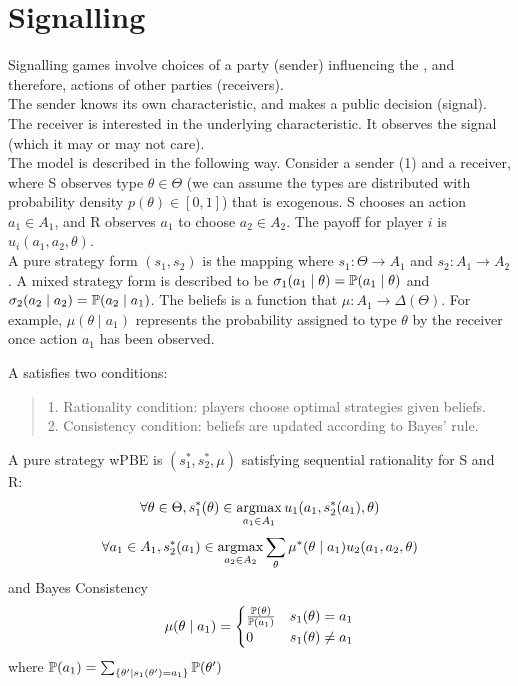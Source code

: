 \section{Signalling}
Signalling games involve choices of a party (sender) influencing the , and therefore, actions of other parties (receivers). \\
The sender knows its own characteristic, and makes a public decision (signal). \\
The receiver is interested in the underlying characteristic. It observes the signal (which it may or may not care). \\
The model is described in the following way. Consider a sender (1) and a receiver, where S observes type $\theta \in \Theta$ (we can assume the types are distributed with probability density $p(\theta) \in [0, 1]$) that is exogenous. S chooses an action $a_1 \in A_1$, and R observes $a_1$ to choose $a_2 \in A_2$. The payoff for player $i$ is $u_i(a_1, a_2, \theta)$. \\
A pure strategy form $(s_1, s_2)$ is the mapping where $s_1: \Theta \to A_1$ and $s_2: A_1 \to A_2$. A mixed strategy form is described to be $\sigma_1(a_1 \mid \theta) = \mathbb{P}(a_1 \mid \theta)$ and $\sigma_2(a_2 \mid a_2) = \mathbb{P}(a_2 \mid a_1)$. The beliefs is a function that $\mu: A_1 \to \Delta(\Theta)$. For example, $\mu(\theta \mid a_1)$ represents the probability assigned to type $\theta$ by the receiver once action $a_1$ has been observed.
\begin{definition}
    A  satisfies two conditions:
    \begin{quote}
        1. Rationality condition: players choose optimal strategies given beliefs. \\
        2. Consistency condition: beliefs are updated according to Bayes' rule.
    \end{quote}
    A pure strategy wPBE is $(s_1^*, s_2^*, \mu)$ satisfying sequential rationality for S and R:
    $$\forall \theta \in \Theta, s_1^*(\theta) \in \operatorname*{argmax}_{a_1 \in A_1} u_1(a_1, s_2^*(a_1), \theta)$$
    $$\forall a_1 \in A_1, s_2^*(a_1) \in \operatorname*{argmax}_{a_2 \in A_2} \sum_{\theta} \mu^*(\theta \mid a_1) u_2(a_1, a_2, \theta)$$
    and Bayes Consistency
    $$\mu(\theta \mid a_1) = \begin{cases}
        \frac{\mathbb{P}(\theta)}{\mathbb{P}(a_1)} & s_1(\theta) = a_1 \\
        0 & s_1(\theta) \ne a_1
    \end{cases}$$
    where $\mathbb{P}(a_1) = \sum_{\{\theta' \mid s_1(\theta') = a_1\}} \mathbb{P}(\theta')$
\end{definition}

